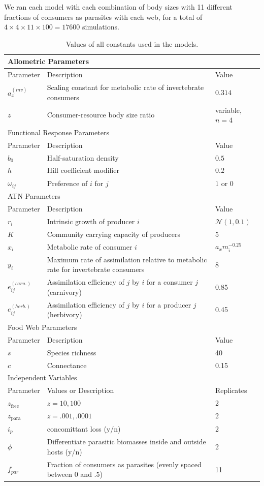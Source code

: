 \documentclass[11pt]{amsart}
\begin{document}
We ran each model with each combination of body sizes with 11 different fractions of consumers as parasites with each web, for a total of $4\times4\times11\times 100 =17600$ simulations. 

\begin{table}
\begin{tabularx}{\textwidth}{|l|X|l|}
\hline
\multicolumn{3}{|X|}{Allometric Parameters}\\
\hline
Parameter&Description&Value\\
\hline
$a_x^{(inv)}$&Scaling constant for metabolic rate of invertebrate consumers & $0.314$\\
$z$&Consumer-resource body size ratio&variable, $n=4$\\
\hline
\hline
\multicolumn{3}{|X|}{Functional Response Parameters}\\
\hline
Parameter&Description&Value\\
\hline
$b_0$&Half-saturation density&$0.5$\\
$h$&Hill coefficient modifier& $0.2$\\
$\omega_{ij}$&Preference of $i$ for $j$&$1$ or $0$\\
\hline
\hline
\multicolumn{3}{|X|}{ATN Parameters}\\
\hline
Parameter&Description&Value\\
\hline
$r_i$&Intrinsic growth of producer $i$&$\mathcal{N}(1,0.1)$\\
$K$&Community carrying capacity of producers &5\\
$x_i$&Metabolic rate of consumer $i$&$a_x m_i^{-0.25}$\\
$y_i$&Maximum rate of assimilation relative to metabolic rate for invertebrate consumers & 8\\
$e_{ij}^{(carn.)}$&Assimilation efficiency of $j$ by $i$ for a consumer $j$ (carnivory) & 0.85\\
$e_{ij}^{(herb.)}$&Assimilation efficiency of $j$ by $i$ for a producer $j$ (herbivory) & 0.45\\
\hline
\hline
\multicolumn{3}{|X|}{Food Web Parameters}\\
\hline
Parameter&Description&Value\\
\hline
$s$&Species richness&40\\
$c$&Connectance & 0.15\\
\hline
\hline
\multicolumn{3}{|X|}{Independent Variables}\\
\hline
Parameter & Values or Description & Replicates\\
$z_\text{free}$&$z=10,100$&2\\
$z_\text{para}$&$z=.001,.0001$&2\\
$i_p$&concomittant loss (y/n)&2\\
$\phi$&Differentiate parasitic biomasses inside and outside hosts (y/n)&2\\
$f_{par}$&Fraction of consumers as parasites (evenly spaced between 0 and .5)&11\\
\hline
\end{tabularx}
\caption{Values of all constants used in the models.  \label{tab:param}}
\end{table}
\newpage
\end{document}
